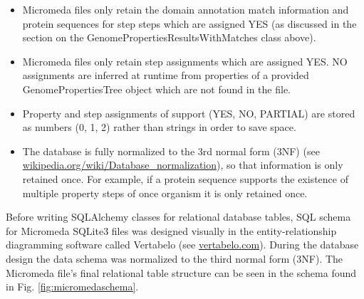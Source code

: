 \begin{itemize}
\item Micromeda files only retain the domain annotation match information and protein sequences for step steps which are assigned YES (as discussed in the section on the GenomePropertiesResultsWithMatches class above).
\item Micromeda files only retain step assignments which are assigned YES. NO assignments are inferred at runtime from properties of a provided GenomePropertiesTree object which are not found in the file.
\item Property and step assignments of support (YES, NO, PARTIAL) are stored as numbers (0, 1, 2) rather than strings in order to save space.
\item The database is fully normalized to the 3rd normal form (3NF) (see \\ \href{en.wikipedia.org/wiki/Database\_normalization}{wikipedia.org/wiki/Database\_normalization}), so that information is only retained once. For example, if a protein sequence supports the existence of multiple property steps of once organism it is only retained once. 
\end{itemize}

Before writing SQLAlchemy classes for relational database tables, SQL schema for Micromeda SQLite3 files was designed visually in the entity-relationship diagramming software called Vertabelo (see \href{www.vertabelo.com}{vertabelo.com}). During the database design the data schema was normalized to the third normal form (3NF). The Micromeda file's final relational table structure can be seen in the schema found in Fig. \ref{fig:micromedaschema}.

